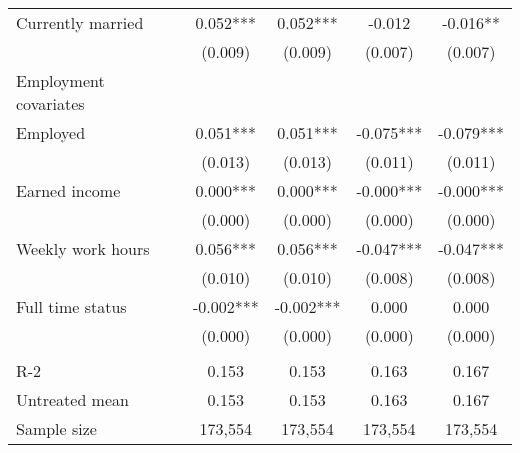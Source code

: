 \begin{tabular}{lcccc}
 Currently married   & 0.052***   & 0.052***   & -0.012   & -0.016**  \\
 & (0.009)   & (0.009)   & (0.007)   & (0.007)  \\
 Employment covariates  \\
 Employed   & 0.051***   & 0.051***   & -0.075***   & -0.079***  \\
 & (0.013)   & (0.013)   & (0.011)   & (0.011)  \\
 Earned income   & 0.000***   & 0.000***   & -0.000***   & -0.000***  \\
 & (0.000)   & (0.000)   & (0.000)   & (0.000)  \\
 Weekly work hours   & 0.056***   & 0.056***   & -0.047***   & -0.047***  \\
 & (0.010)   & (0.010)   & (0.008)   & (0.008)  \\
 Full time status   & -0.002***   & -0.002***   & 0.000   & 0.000  \\
 & (0.000)   & (0.000)   & (0.000)   & (0.000)  \\
\\
R-2 & 0.153 & 0.153 & 0.163 & 0.167 \\
Untreated mean & 0.153 & 0.153 & 0.163 & 0.167 \\
Sample size & 173,554 & 173,554 & 173,554 & 173,554 \\
\bottomrule
\bottomrule
\end{tabular}